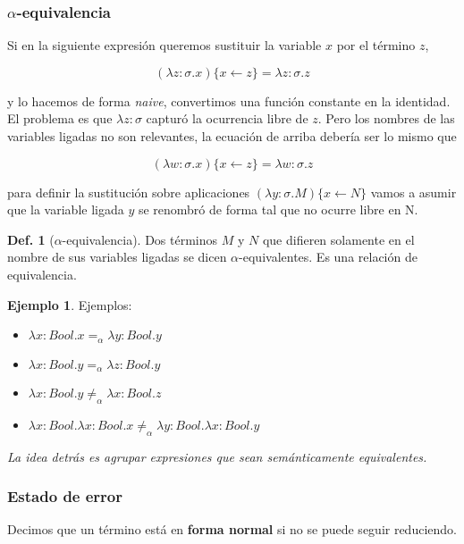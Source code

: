 \documentclass{report}
\theoremstyle{definition} %
\newtheorem{definition}{Def.}[chapter]
\newtheorem*{example*}{Ejemplo}
\newcommand{\aeq}{=_\alpha}
\newcommand{\naeq}{\neq_\alpha}
\newcommand{\abs}[3]{\lambda #1 : #2 . #3}
\newcommand{\sustOne}[3]{#1 \{ #2 \leftarrow #3 \}}
\begin{document}
\subsubsection{$\alpha$-equivalencia}

Si en la siguiente expresión queremos sustituir la variable $x$ por el término
$z$,

\[
    \sustOne{(\abs{z}{\sigma}{x})}{x}{z} = \abs{z}{\sigma}{z}
\]

y lo hacemos de forma \textit{naive}, convertimos una función constante en la
identidad. El problema es que $\lambda z : \sigma$ capturó la ocurrencia libre
de $z$. Pero los nombres de las variables ligadas no son relevantes, la ecuación
de arriba debería ser lo mismo que

\[
    \sustOne{(\abs{w}{\sigma}{x})}{x}{z} = \abs{w}{\sigma}{z}
\]

para definir la sustitución sobre aplicaciones
$\sustOne{(\abs{y}{\sigma}{M})}{x}{N}$ vamos a asumir que la variable ligada $y$
se renombró de forma tal que no ocurre libre en N.

\begin{definition}[$\alpha$-equivalencia]
    Dos términos $M$ y $N$ que difieren solamente en el nombre de sus variables
    ligadas se dicen $\alpha$-equivalentes. Es una relación de equivalencia.
    
    \begin{example*} Ejemplos:
        \begin{itemize}
            \item $\abs{x}{Bool}{x} \aeq \abs{y}{Bool}{y}$
            \item $\abs{x}{Bool}{y} \aeq \abs{z}{Bool}{y}$
            \item $\abs{x}{Bool}{y} \naeq \abs{x}{Bool}{z}$
            \item $\abs{x}{Bool}{\abs{x}{Bool}{x}} \naeq \abs{y}{Bool}{\abs{x}{Bool}{y}}$
        \end{itemize}        
    \end{example*}
\end{definition}

\textit{La idea detrás es agrupar expresiones que sean semánticamente equivalentes.}

\subsubsection{Estado de error}

Decimos que un término está en \textbf{forma normal} si no se puede seguir
reduciendo.
\end{document}
